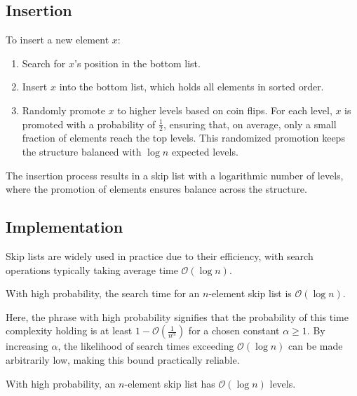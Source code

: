 \subsection{Insertion}
To insert a new element $x$: 
\begin{enumerate}
    \item Search for $x$'s position in the bottom list.
    \item Insert $x$  into the bottom list, which holds all elements in sorted order.
    \item Randomly promote $x$ to higher levels based on coin flips.
        For each level, $x$ is promoted with a probability of $\frac{1}{2}$, ensuring that, on average, only a small fraction of elements reach the top levels.
        This randomized promotion keeps the structure balanced with $\log n$ expected levels.
\end{enumerate}
The insertion process results in a skip list with a logarithmic number of levels, where the promotion of elements ensures balance across the structure.

\subsection{Implementation}
Skip lists are widely used in practice due to their efficiency, with search operations typically taking average time $\mathcal{O}(\log n)$.
\begin{theorem}
    With high probability, the search time for an $n$-element skip list is $\mathcal{O}(\log n)$.
\end{theorem}
Here, the phrase with high probability signifies that the probability of this time complexity holding is at least $1-\mathcal{O}\left(\frac{1}{n^\alpha}\right)$ for a chosen constant $\alpha\geq 1$. 
By increasing $\alpha$, the likelihood of search times exceeding $\mathcal{O}(\log n)$ can be made arbitrarily low, making this bound practically reliable.
\begin{lemma}
    With high probability, an $n$-element skip list has $\mathcal{O}(\log n)$ levels.
\end{lemma}